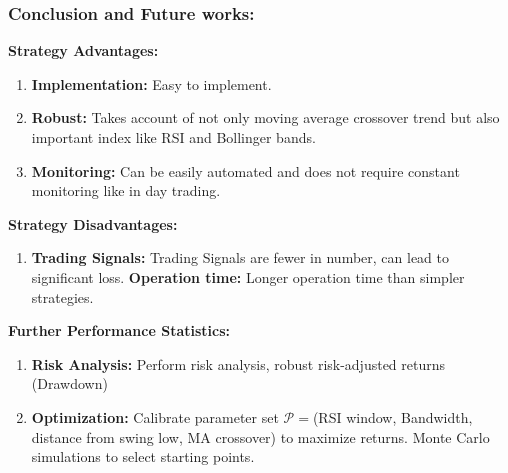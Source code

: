 \documentclass[slidestop,compress,mathserif,9pt]{beamer}
\def\be{\begin{enumerate}}
\def\ee{\end{enumerate}}
\begin{document}
\begin{frame}
\frametitle{Conclusion and Future works:}

\small{

\textbf{Strategy Advantages:}
\be
\item
\textbf{Implementation:} Easy to implement.
\item
\textbf{Robust:} Takes account of not only moving average crossover trend but also important index like RSI
and Bollinger bands.
\item
\textbf{Monitoring:} Can be easily automated and does not require constant monitoring like in day trading.
\ee
\textbf{Strategy Disadvantages:}
\be
\item
\textbf{Trading Signals:} Trading Signals are fewer in number, can lead to significant loss.
\textbf{Operation time:} Longer operation time than simpler strategies.
\ee
\textbf{Further Performance Statistics:}
\be
\item 
\textbf{Risk Analysis:}
Perform risk analysis, robust risk-adjusted returns (Drawdown) 
\item
\textbf{Optimization:} Calibrate parameter set $\mathcal{P}= $(RSI window, Bandwidth, distance from swing low, MA crossover) to maximize returns. Monte Carlo simulations to select starting points.
\ee

}













\end{frame}
\end{document}
